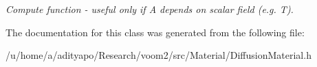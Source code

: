 \begin{DoxyCompactItemize}
\begin{DoxyCompactList}\small\item\em Compute function -\/ useful only if A depends on scalar field (e.g. T). \item\end{DoxyCompactList}\end{DoxyCompactItemize}


The documentation for this class was generated from the following file:\begin{DoxyCompactItemize}
\item 
/u/home/a/adityapo/Research/voom2/src/Material/DiffusionMaterial.h\end{DoxyCompactItemize}
